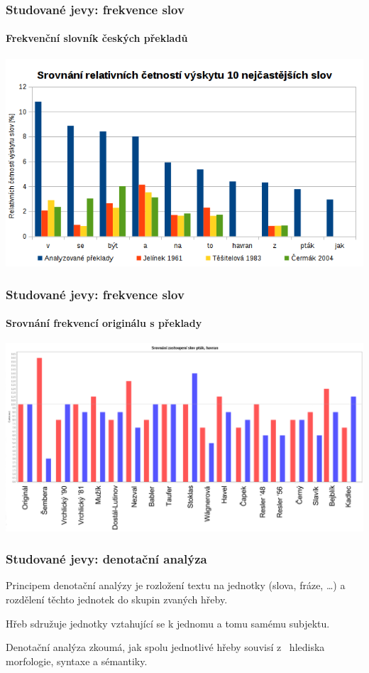 \documentclass[12pt]{beamer}
\begin{document}
\begin{frame}
	\frametitle{Studované jevy: frekvence slov}
	\framesubtitle{Frekvenční slovník českých překladů}

	\vspace{-8.8pt}
	\begin{center}
		\includegraphics[width=\linewidth,height=0.86\textheight,keepaspectratio]{cetnost-slov}
	\end{center}

\end{frame}

\begin{frame}
	\frametitle{Studované jevy: frekvence slov}
	\framesubtitle{Srovnání frekvencí originálu s překlady}

	\begin{center}
		\includegraphics[width=\linewidth,height=0.86\textheight,keepaspectratio]{cetnost-slov-orig}
	\end{center}

\end{frame}

\begin{frame}
	\frametitle{Studované jevy: denotační analýza}

	Principem denotační analýzy je rozložení textu na jednotky (slova, fráze, …) a rozdělení těchto jednotek do skupin zvaných hřeby.

	Hřeb sdružuje jednotky vztahující se k jednomu a tomu samému subjektu.

	Denotační analýza zkoumá, jak spolu jednotlivé hřeby souvisí z~	hlediska morfologie, syntaxe a sémantiky.

\end{frame}
\end{document}
